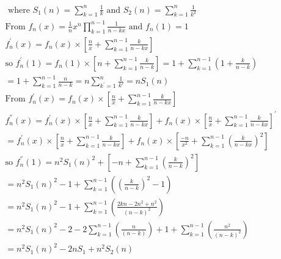 \documentclass[10pt,a4paper]{letter}
\begin{document}
\begin{align*}
&\text{ where }S_{1}(n)=\sum_{k=1}^{n}\frac{1}{k}\text{ and }S_{2}(n)=\sum_{k=1}^{n}\frac{1}{k^{2}} \\
	&\text{From }f_{n}(x)=\frac{1}{n}x^{n} \prod _{k=1}^{n-1}\frac{1}{n-kx}\text{ and }f_{n}(1)=1\\
	&f^{'}_{n}(x)=f_{n}(x)\times [\frac{n}{x}+\sum_{k=1}^{n-1}\frac{k}{n-kx}]\\
	&\text{so }f^{'}_{n}(1)=f_{n}(1)\times [n+\sum_{k=1}^{n-1}\frac{k}{n-k}]=1+\sum_{k=1}^{n-1}(1+\frac{k}{n-k})\\
	&=1+\sum_{k=1}^{n-1}\frac{n}{n-k}
	=n\sum_{k^{'}=1}^{n}\frac{1}{k{'}}=nS_{1}(n)\\
	&\text{From }f^{'}_{n}(x)=f_{n}(x)\times [\frac{n}{x}+\sum_{k=1}^{n-1}\frac{k}{n-kx}]\\
	&f^{''}_{n}(x)=f^{'}_{n}(x)\times [\frac{n}{x}+\sum_{k=1}^{n-1}\frac{k}{n-kx}]+f_{n}(x)\times [\frac{n}{x}+\sum_{k=1}^{n-1}\frac{k}{n-kx}]^{'}\\
	&=f^{'}_{n}(x)\times [\frac{n}{x}+\sum_{k=1}^{n-1}\frac{k}{n-kx}]+f_{n}(x)\times [\frac{-n}{x^{2}}+\sum_{k=1}^{n-1}(\frac{k}{n-kx})^{2} ]\\
	&\text{so }f^{''}_{n}(1)=n^{2}S_{1}(n)^{2}+[-n+\sum_{k=1}^{n-1}(\frac{k}{n-k})^{2}] \\
	&=n^{2}S_{1}(n)^{2}-1+\sum_{k=1}^{n-1}((\frac{k}{n-k})^{2}-1)\\
	&=n^{2}S_{1}(n)^{2}-1+\sum_{k=1}^{n-1}(\frac{2kn-2n^{2}+n^{2}}{(n-k)^2})\\
	&=n^{2}S_{1}(n)^{2}-2-2\sum_{k=1}^{n-1}(\frac{n}{(n-k)})+1+\sum_{k=1}^{n-1}(\frac{n^{2}}{(n-k)^2})\\
	&=n^{2}S_{1}(n)^{2}-2nS_{1}+n^{2}S_{2}(n)	
\end{align*}
\end{document}
